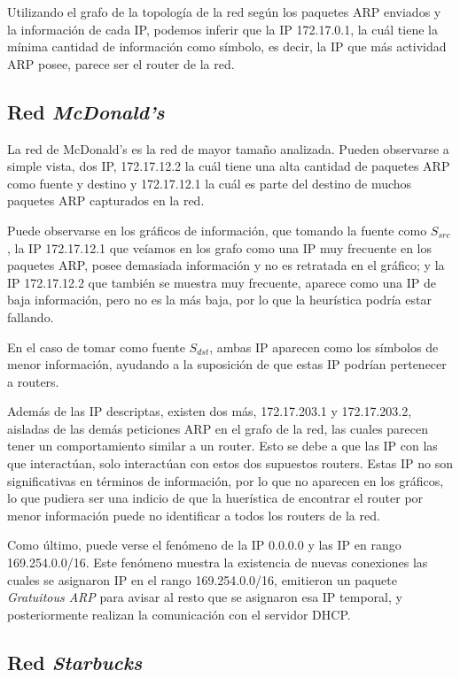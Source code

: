 \documentclass[a4paper, 10pt, twoside]{article}
\begin{document}
Utilizando el grafo de la topología de la red según los paquetes ARP enviados y la información de cada IP, podemos inferir que la IP 172.17.0.1, la cuál tiene la mínima cantidad de información como símbolo, es decir, la IP que más actividad ARP posee, parece ser el router de la red.

\subsection{Red \emph{McDonald's}}
La red de McDonald's es la red de mayor tamaño analizada. Pueden observarse a simple vista, dos IP, 172.17.12.2 la cuál tiene una alta cantidad de paquetes ARP como fuente y destino y 172.17.12.1 la cuál es parte del destino de muchos paquetes ARP capturados en la red.

Puede observarse en los gráficos de información, que tomando la fuente como $S_{src}$, la IP 172.17.12.1 que veíamos en los grafo como una IP muy frecuente en los paquetes ARP, posee demasiada información y no es retratada en el gráfico; y la IP 172.17.12.2 que también se muestra muy frecuente, aparece como una IP de baja información, pero no es la más baja, por lo que la heurística podría estar fallando.

En el caso de tomar como fuente $S_{dst}$, ambas IP aparecen como los símbolos de menor información, ayudando a la suposición de que estas IP podrían  pertenecer a routers.

Además de las IP descriptas, existen dos más, 172.17.203.1 y 172.17.203.2, aisladas de las demás peticiones ARP en el grafo de la red, las cuales parecen tener un comportamiento similar a un router. Esto se debe a que las IP con las que interactúan, solo interactúan con estos dos supuestos routers. Estas IP no son significativas en términos de información, por lo que no aparecen en los gráficos, lo que pudiera ser una indicio de que la huerística de encontrar el router por menor información puede no identificar a todos los routers de la red. 

Como último, puede verse el fenómeno de la IP 0.0.0.0 y las IP en rango 169.254.0.0/16. Este fenómeno muestra la existencia de nuevas conexiones las cuales se asignaron IP en el rango 169.254.0.0/16, emitieron un paquete \textit{Gratuitous ARP} para avisar al resto que se asignaron esa IP temporal, y posteriormente realizan la comunicación con el servidor DHCP.

\subsection{Red \emph{Starbucks}}
\end{document}
